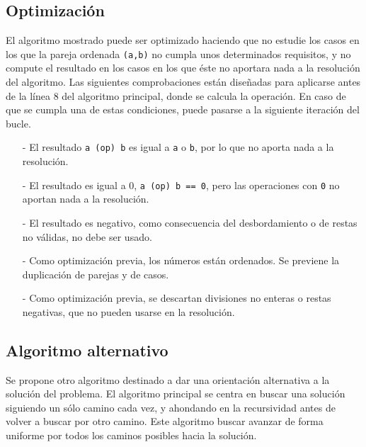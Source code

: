 \documentclass[a4paper,10pt]{scrartcl}
\def\C++#1{\texttt{#1}}
\begin{document}
   \subsection{Optimización}
   El algoritmo mostrado puede ser optimizado haciendo que no estudie los casos en los que la pareja ordenada \C++{(a,b)} no cumpla unos
   determinados requisitos, y no compute el resultado en los casos en los que éste no aportara nada a la resolución del algoritmo. Las
   siguientes comprobaciones están diseñadas para aplicarse antes de la línea 8 del algoritmo principal, donde se calcula la operación. 
   En caso de que se cumpla una de estas condiciones, puede pasarse a la siguiente iteración del bucle.\\
   \begin{itemize}
    \item [-] El resultado \C++{a (op) b} es igual a \C++{a} o \C++{b}, por lo que no aporta nada a la resolución.
    \item [-] El resultado es igual a 0, \C++{a (op) b == 0}, pero las operaciones con \C++{0} no aportan nada a la resolución.
    \item [-] El resultado es negativo, como consecuencia del desbordamiento o de restas no válidas, no debe ser usado.
    \item [-] Como optimización previa, los números están ordenados. Se previene la duplicación de parejas y de casos.
    \item [-] Como optimización previa, se descartan divisiones no enteras o restas negativas, que no pueden usarse en la resolución.
   \end{itemize}

   
   \newpage
   \subsection{Algoritmo alternativo}
   Se propone otro algoritmo destinado a dar una orientación alternativa a la solución del problema. El algoritmo principal se centra
   en buscar una solución siguiendo un sólo camino cada vez, y ahondando en la recursividad antes de volver a buscar por otro camino.
   Este algoritmo buscar avanzar de forma uniforme por todos los caminos posibles hacia la solución.
   
\end{document}
